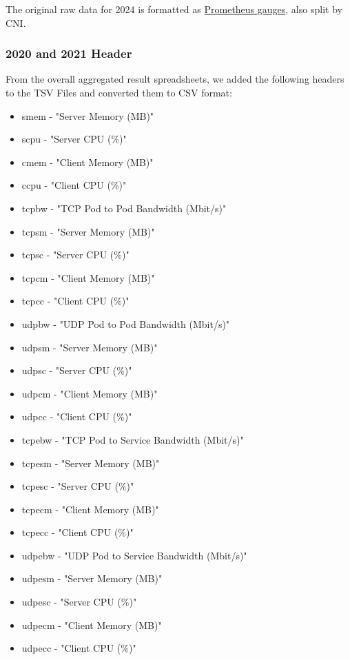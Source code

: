 The original raw data for 2024 is formatted as \href{https://prometheus.io/docs/concepts/metric_types/#gauge}{Prometheus gauges}, also split by CNI.

\subsubsection{2020 and 2021 Header}

From the overall aggregated result spreadsheets, we added the following headers to the TSV Files and converted them to CSV format:

\begin{itemize}
    \item smem - "Server Memory (MB)"
    \item scpu - "Server CPU (\%)"
    \item cmem - "Client Memory (MB)"
    \item ccpu - "Client CPU (\%)"
    \item tcpbw - "TCP Pod to Pod Bandwidth (Mbit/s)"
    \item tcpsm - "Server Memory (MB)"
    \item tcpsc - "Server CPU (\%)"
    \item tcpcm - "Client Memory (MB)"
    \item tcpcc - "Client CPU (\%)"
    \item udpbw - "UDP Pod to Pod Bandwidth (Mbit/s)"
    \item udpsm - "Server Memory (MB)"
    \item udpsc - "Server CPU (\%)"
    \item udpcm - "Client Memory (MB)"
    \item udpcc - "Client CPU (\%)"
    \item tcpebw - "TCP Pod to Service Bandwidth (Mbit/s)"
    \item tcpesm - "Server Memory (MB)"
    \item tcpesc - "Server CPU (\%)"
    \item tcpecm - "Client Memory (MB)"
    \item tcpecc - "Client CPU (\%)"
    \item udpebw - "UDP Pod to Service Bandwidth (Mbit/s)"
    \item udpesm - "Server Memory (MB)"
    \item udpesc - "Server CPU (\%)"
    \item udpecm - "Client Memory (MB)"
    \item udpecc - "Client CPU (\%)"
\end{itemize}

